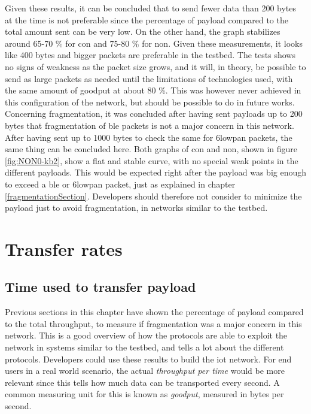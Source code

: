 \noindent Given these results, it can be concluded that to send fewer data than 200 bytes at the time is not preferable since the percentage of \gls{payload} compared to the total amount sent can be very low. On the other hand, the graph stabilizes around 65-70 \% for \gls{con} and 75-80 \% for \gls{non}. Given these measurements, it looks like 400 bytes and bigger packets are preferable in the testbed. The tests shows no signs of weakness as the packet size grows, and it will, in theory, be possible to send as large packets as needed until the limitations of technologies used, with the same amount of \gls{goodput} at about 80 \%. This was however never achieved in this configuration of the network, but should be possible to do in future works. Concerning fragmentation, it was concluded after having sent \glspl{payload} up to 200 bytes that fragmentation of \gls{ble} packets is not a major concern in this network. After having sent up to 1000 bytes to check the same for \gls{6lowpan} packets, the same thing can be concluded here. Both graphs of \gls{con} and \gls{non}, shown in figure \ref{fig:NON0-kb2}, show a flat and stable curve, with no special weak points in the different \glspl{payload}. This would be expected right after the \gls{payload} was big enough to exceed a \gls{ble} or \gls{6lowpan} packet, just as explained in chapter \ref{fragmentationSection}. Developers should therefore not consider to minimize the \gls{payload} just to avoid fragmentation, in networks similar to the testbed. 




\section{Transfer rates}

\subsection{Time used to transfer payload}

\noindent Previous sections in this chapter have shown the percentage of payload compared to the total throughput, to measure if fragmentation was a major concern in this network. This is a good overview of how the protocols are able to exploit the network in systems similar to the testbed, and tells a lot about the different protocols. Developers could use these results to build the \gls{iot} network. For end users in a real world scenario, the actual \textit{throughput per time} would be more relevant since this tells how much data can be transported every second. A common measuring unit for this is known as \textit{\gls{goodput}}, measured in bytes per second.  



